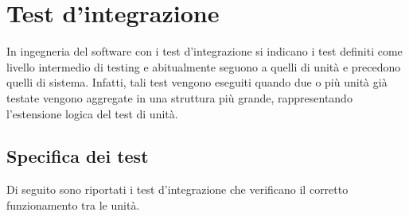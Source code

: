 \section{Test d'integrazione}\label{sec:test-d'integrazione}
In ingegneria del software con i test d'integrazione si indicano i test definiti come livello intermedio di testing e abitualmente seguono a quelli di unità e precedono quelli di sistema.
Infatti, tali test vengono eseguiti quando due o più unità già testate vengono aggregate in una struttura più grande, rappresentando l'estensione logica del test di unità.

\setcounter{rowcount}{0}

\subsection{Specifica dei test}\label{subsec:specifica-dei-test-integrazione}
Di seguito sono riportati i test d'integrazione che verificano il corretto funzionamento tra le unità.
